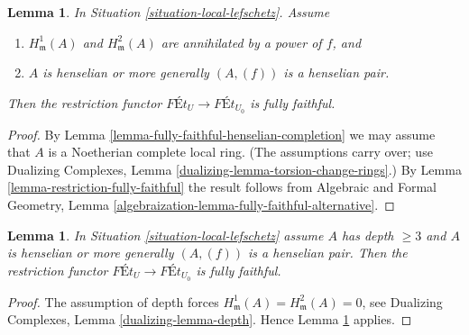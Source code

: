 \documentclass{stacks-project}
\newenvironment{reference}{\comment}{\endcomment}
\theoremstyle{plain}
\newtheorem{lemma}[subsection]{Lemma}
\theoremstyle{definition}
\theoremstyle{remark}
\numberwithin{equation}{subsection}
\begin{document}
\begin{lemma}
\label{lemma-fully-faithful-minimal}
\begin{reference}
\cite[Corollary 1.11]{Bhatt-local}
\end{reference}
In Situation \ref{situation-local-lefschetz}. Assume
\begin{enumerate}
\item $H^1_\mathfrak m(A)$ and $H^2_\mathfrak m(A)$ are
annihilated by a power of $f$, and
\item $A$ is henselian or more generally $(A, (f))$ is a henselian pair.
\end{enumerate}
Then the restriction functor
$\textit{F\'Et}_U \longrightarrow \textit{F\'Et}_{U_0}$
is fully faithful.
\end{lemma}

\begin{proof}
By Lemma \ref{lemma-fully-faithful-henselian-completion}
we may assume that $A$ is a Noetherian complete local ring.
(The assumptions carry over; use
Dualizing Complexes, Lemma \ref{dualizing-lemma-torsion-change-rings}.)
By Lemma \ref{lemma-restriction-fully-faithful}
the result follows from
Algebraic and Formal Geometry, Lemma
\ref{algebraization-lemma-fully-faithful-alternative}.
\end{proof}

\begin{lemma}
\label{lemma-fully-faithful}
In Situation \ref{situation-local-lefschetz} assume $A$ has depth $\geq 3$
and $A$ is henselian or more generally $(A, (f))$ is a henselian pair. Then
the restriction functor
$\textit{F\'Et}_U \to \textit{F\'Et}_{U_0}$
is fully faithful.
\end{lemma}

\begin{proof}
The assumption of depth forces
$H^1_\mathfrak m(A) = H^2_\mathfrak m(A) = 0$, see
Dualizing Complexes, Lemma \ref{dualizing-lemma-depth}.
Hence Lemma \ref{lemma-fully-faithful-minimal} applies.
\end{proof}
\end{document}
